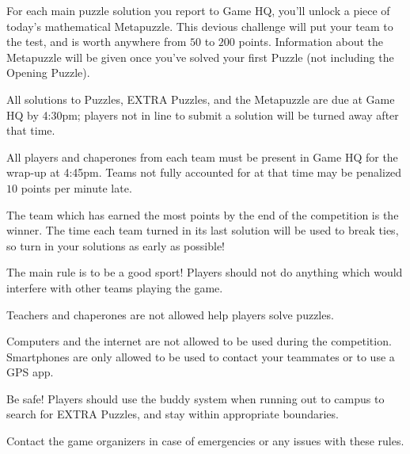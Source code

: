 \begin{rules}

For each main puzzle solution you report to Game HQ, you'll unlock a piece
of today's
mathematical Metapuzzle. This devious challenge will put your team to the
test, and is worth anywhere from \(50\) to \(200\) points. Information
about the Metapuzzle will be given once you've solved your first
Puzzle (not including the Opening Puzzle).


All solutions to Puzzles, EXTRA Puzzles, and the Metapuzzle
are due at Game HQ by 4:30pm; players not in line to submit a
solution will be turned away after that time.

All players and chaperones
from each team must be present in Game HQ for the wrap-up at
4:45pm. Teams not fully accounted for at that time may be penalized
\(10\) points per minute late.


The team which has earned the most points by the end of the competition
is the winner. The time each team turned in its
last solution will be used to break ties, so turn in your solutions as
early as possible!


The main rule is to be a good sport! Players should not do anything which
would interfere with other teams playing the game.

Teachers and chaperones are not allowed help players solve puzzles.

Computers and the internet are not allowed to be used during the competition.
Smartphones are only allowed to be used to contact your teammates or
to use a GPS app.

Be safe! Players should use the buddy system when running
out to campus to search for EXTRA Puzzles, and stay within appropriate
boundaries.

Contact the game organizers in case of emergencies
or any issues with these rules.

  \newpage

\end{rules}